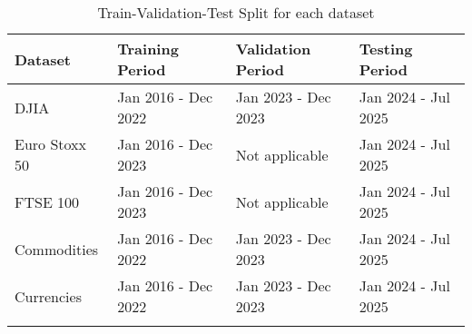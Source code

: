 \begin{longtable}{|l|l|l|l|}
    \hline
    \textbf{Dataset} & \textbf{Training Period} & \textbf{Validation Period} & \textbf{Testing Period} \\
    \hline
    DJIA & Jan 2016 - Dec 2022 & Jan 2023 - Dec 2023 & Jan 2024 - Jul 2025 \\
    \hline
    Euro Stoxx 50 & Jan 2016 - Dec 2023 & Not applicable & Jan 2024 - Jul 2025 \\
    \hline
    FTSE 100 & Jan 2016 - Dec 2023 & Not applicable & Jan 2024 - Jul 2025 \\
    \hline
    Commodities & Jan 2016 - Dec 2022 & Jan 2023 - Dec 2023 & Jan 2024 - Jul 2025 \\
    \hline
    Currencies & Jan 2016 - Dec 2022 & Jan 2023 - Dec 2023 & Jan 2024 - Jul 2025 \\
    \hline
    \caption{Train-Validation-Test Split for each dataset}
    \label{tab:dataset-split}
\end{longtable}